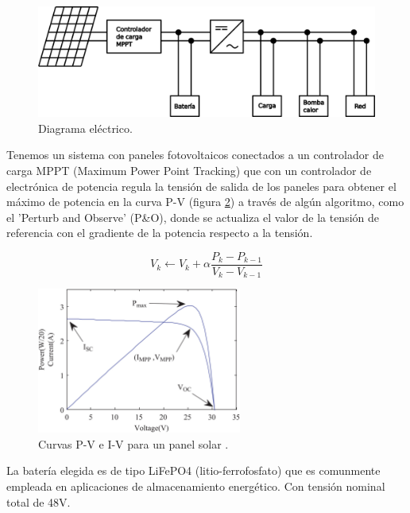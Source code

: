 \begin{figure}[h] \centering
	\centering
	\includegraphics[width=1\textwidth]{./capitulos/resultados_discusion/images/diagrama_electrico.png}
	\caption{Diagrama eléctrico.}
	\label{fig:electic_diagram}
\end{figure}

Tenemos un sistema con paneles fotovoltaicos conectados a un controlador de
carga MPPT (Maximum Power Point Tracking) que con un controlador de electrónica
de potencia regula la tensión de salida de los paneles para obtener el máximo
de potencia en la curva P-V (figura \ref{fig:solar_P-V_I-V}) a través de algún
algoritmo, como el 'Perturb and Observe' (P\&O), donde se actualiza el valor de
la tensión de referencia con el gradiente de la potencia respecto a la tensión.

\begin{equation}
	V_{k} \leftarrow V_k + \alpha \frac{P_k - P_{k-1}}{V_{k}-V_{k-1}}
\end{equation}

\begin{figure}[h] \centering
	\centering
	\includegraphics[width=0.6\textwidth]{./capitulos/resultados_discusion/images/solar_P-V_I-V.jpg}
	\caption{Curvas P-V e I-V para un panel solar \cite{podder2019mppt}.}
	\label{fig:solar_P-V_I-V}
\end{figure}


La batería elegida es de tipo LiFePO4 (litio-ferrofosfato) que es comunmente
empleada en aplicaciones de almacenamiento energético. Con tensión nominal total
de 48V.

